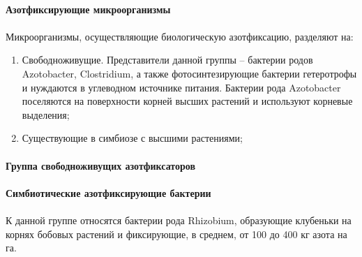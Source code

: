 \paragraph*{Азотфиксирующие микроорганизмы}

\paragraph*{}Микроорганизмы, осуществляющие биологическую азотфиксацию, разделяют на:

\begin{enumerate}
\item Свободноживущие. Представители данной группы -- бактерии родов Azotobacter, Clostridium, а также фотосинтезирующие бактерии гетеротрофы и нуждаются в углеводном источнике питания. Бактерии рода Azotobacter поселяются на поверхности корней высших растений и используют корневые выделения;

\item Существующие в симбиозе с высшими растениями;
\end{enumerate}

\paragraph*{Группа свободноживущих азотфиксаторов}

\paragraph*{}

\paragraph*{Симбиотические азотфиксирующие бактерии}

\paragraph*{}К данной группе относятся бактерии рода Rhizobium, образующие клубеньки на корнях бобовых растений и фиксирующие, в среднем, от 100 до 400 кг азота на га. 


